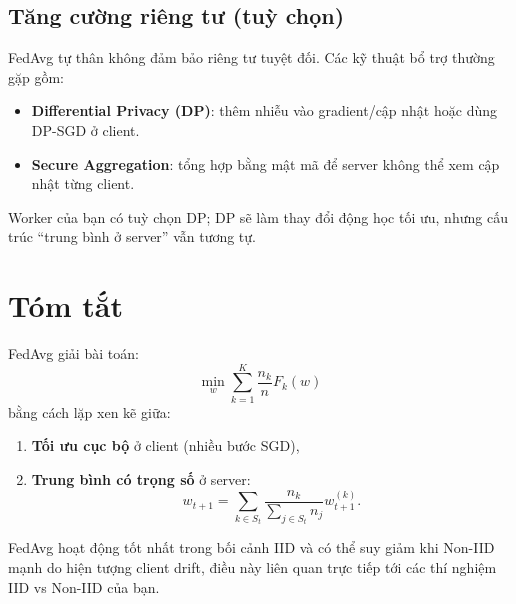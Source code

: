 \documentclass[12pt,a4paper]{article}
\begin{document}
\subsection{Tăng cường riêng tư (tuỳ chọn)}
FedAvg tự thân không đảm bảo riêng tư tuyệt đối. Các kỹ thuật bổ trợ thường gặp gồm:
\begin{itemize}
    \item \textbf{Differential Privacy (DP)}: thêm nhiễu vào gradient/cập nhật hoặc dùng DP-SGD ở client.
    \item \textbf{Secure Aggregation}: tổng hợp bằng mật mã để server không thể xem cập nhật từng client.
\end{itemize}
Worker của bạn có tuỳ chọn DP; DP sẽ làm thay đổi động học tối ưu, nhưng cấu trúc ``trung bình ở server'' vẫn tương tự.

\section{Tóm tắt}

FedAvg giải bài toán:
\[
\min_w \sum_{k=1}^{K}\frac{n_k}{n}F_k(w)
\]
bằng cách lặp xen kẽ giữa:
\begin{enumerate}
    \item \textbf{Tối ưu cục bộ} ở client (nhiều bước SGD),
    \item \textbf{Trung bình có trọng số} ở server:
    \[
    w_{t+1} = \sum_{k \in S_t} \frac{n_k}{\sum_{j \in S_t} n_j} w_{t+1}^{(k)}.
    \]
\end{enumerate}

FedAvg hoạt động tốt nhất trong bối cảnh IID và có thể suy giảm khi Non-IID mạnh do hiện tượng client drift, điều này liên quan trực tiếp tới các thí nghiệm IID vs Non-IID của bạn.
\end{document}
